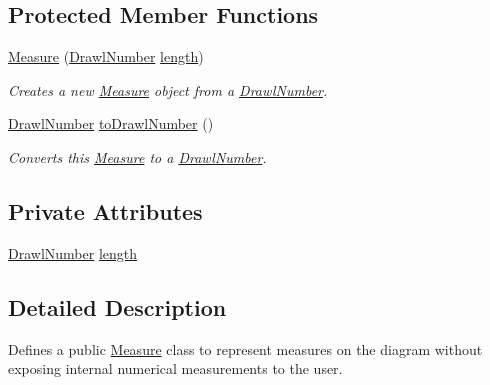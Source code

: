 \subsection*{Protected Member Functions}
\begin{DoxyCompactItemize}
\item 
\hyperlink{classcom_1_1aarrelaakso_1_1drawl_1_1_measure_a8de66af52cef5213749889357261110b}{Measure} (\hyperlink{classcom_1_1aarrelaakso_1_1drawl_1_1_drawl_number}{Drawl\+Number} \hyperlink{classcom_1_1aarrelaakso_1_1drawl_1_1_measure_a13ac55ae968c5e7bed4b3305370d94c5}{length})
\begin{DoxyCompactList}\small\item\em Creates a new \hyperlink{classcom_1_1aarrelaakso_1_1drawl_1_1_measure}{Measure} object from a \hyperlink{classcom_1_1aarrelaakso_1_1drawl_1_1_drawl_number}{Drawl\+Number}. \end{DoxyCompactList}\item 
\hyperlink{classcom_1_1aarrelaakso_1_1drawl_1_1_drawl_number}{Drawl\+Number} \hyperlink{classcom_1_1aarrelaakso_1_1drawl_1_1_measure_a847bbfcc708d3ff19c89c5303cf69543}{to\+Drawl\+Number} ()
\begin{DoxyCompactList}\small\item\em Converts this \hyperlink{classcom_1_1aarrelaakso_1_1drawl_1_1_measure}{Measure} to a \hyperlink{classcom_1_1aarrelaakso_1_1drawl_1_1_drawl_number}{Drawl\+Number}. \end{DoxyCompactList}\end{DoxyCompactItemize}
\subsection*{Private Attributes}
\begin{DoxyCompactItemize}
\item 
\hyperlink{classcom_1_1aarrelaakso_1_1drawl_1_1_drawl_number}{Drawl\+Number} \hyperlink{classcom_1_1aarrelaakso_1_1drawl_1_1_measure_a13ac55ae968c5e7bed4b3305370d94c5}{length}
\end{DoxyCompactItemize}


\subsection{Detailed Description}
Defines a public \hyperlink{classcom_1_1aarrelaakso_1_1drawl_1_1_measure}{Measure} class to represent measures on the diagram without exposing internal numerical measurements to the user. 

